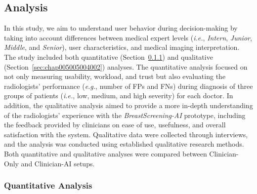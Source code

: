 

\subsection{Analysis}
\label{sec:chap005005004}

In this study, we aim to understand user behavior during decision-making by taking into account differences between medical expert levels ({\it i.e.}, {\it Intern}, {\it Junior}, {\it Middle}, and {\it Senior}), user characteristics, and medical imaging interpretation.
The study included both quantitative (Section~\ref{sec:chap005005004001}) and qualitative (Section~\ref{sec:chap005005004002}) analyses.
The quantitative analysis focused on not only measuring usability, workload, and trust but also evaluating the radiologists' performance ({\it e.g.}, number of \acp{FP} and \acp{FN}) during diagnosis of three groups of patients ({\it i.e.}, low, medium, and high severity) for each doctor.
In addition, the qualitative analysis aimed to provide a more in-depth understanding of the radiologists' experience with the {\it BreastScreening-AI} prototype, including the feedback provided by clinicians on ease of use, usefulness, and overall satisfaction with the system.
Qualitative data were collected through interviews, and the analysis was conducted using established qualitative research methods.
Both quantitative and qualitative analyses were compared between Clinician-Only and Clinician-AI setups.

\subsubsection{Quantitative Analysis}
\label{sec:chap005005004001}

